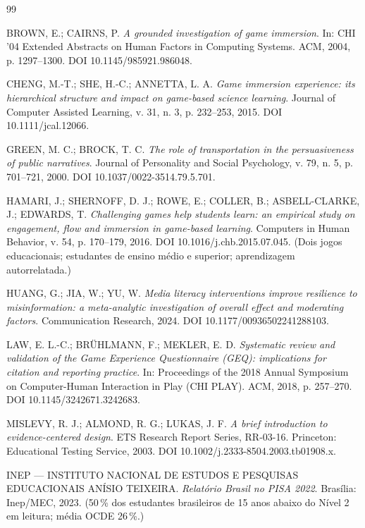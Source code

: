 \documentclass[11pt,a4paper]{article}
\begin{document}
\begin{thebibliography}{99}
\small

BROWN, E.; CAIRNS, P.
\emph{A grounded investigation of game immersion}.
In: CHI '04 Extended Abstracts on Human Factors in Computing Systems. ACM, 2004, p. 1297--1300.
DOI 10.1145/985921.986048.

CHENG, M.-T.; SHE, H.-C.; ANNETTA, L. A.
\emph{Game immersion experience: its hierarchical structure and impact on game-based science
learning}.
Journal of Computer Assisted Learning, v. 31, n. 3, p. 232--253, 2015.
DOI 10.1111/jcal.12066.

GREEN, M. C.; BROCK, T. C.
\emph{The role of transportation in the persuasiveness of public narratives}.
Journal of Personality and Social Psychology, v. 79, n. 5, p. 701--721, 2000.
DOI 10.1037/0022-3514.79.5.701.

HAMARI, J.; SHERNOFF, D. J.; ROWE, E.; COLLER, B.; ASBELL-CLARKE, J.; EDWARDS, T.
\emph{Challenging games help students learn: an empirical study on engagement, flow and immersion
in game-based learning}.
Computers in Human Behavior, v. 54, p. 170--179, 2016.
DOI 10.1016/j.chb.2015.07.045.
(Dois jogos educacionais; estudantes de ensino médio e superior; aprendizagem autorrelatada.)

HUANG, G.; JIA, W.; YU, W.
\emph{Media literacy interventions improve resilience to misinformation: a meta-analytic
investigation of overall effect and moderating factors}.
Communication Research, 2024.
DOI 10.1177/00936502241288103.

LAW, E. L.-C.; BR\"UHLMANN, F.; MEKLER, E. D.
\emph{Systematic review and validation of the Game Experience Questionnaire (GEQ): implications
for citation and reporting practice}.
In: Proceedings of the 2018 Annual Symposium on Computer-Human Interaction in Play (CHI PLAY).
ACM, 2018, p. 257--270.
DOI 10.1145/3242671.3242683.

MISLEVY, R. J.; ALMOND, R. G.; LUKAS, J. F.
\emph{A brief introduction to evidence-centered design}.
ETS Research Report Series, RR-03-16. Princeton: Educational Testing Service, 2003.
DOI 10.1002/j.2333-8504.2003.tb01908.x.

INEP --- INSTITUTO NACIONAL DE ESTUDOS E PESQUISAS EDUCACIONAIS ANÍSIO TEIXEIRA.
\emph{Relatório Brasil no PISA 2022}. Brasília: Inep/MEC, 2023.
(50\,\% dos estudantes brasileiros de 15 anos abaixo do Nível 2 em leitura; média OCDE 26\,\%.)


\end{thebibliography}
\end{document}
